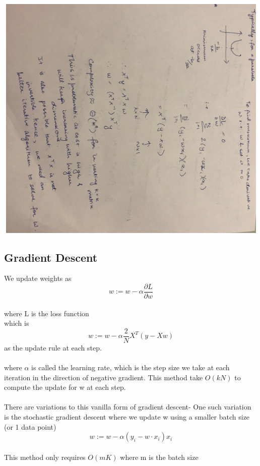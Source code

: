 \includegraphics[width=15cm,height = 12cm, angle = 90, origin=c]{figures/compute_2.JPG}




\subsection{Gradient Descent}
We update weights as $$w := w - \alpha\frac{\partial L}{\partial w}$$
\\
where L is the loss function
\\
which is $$w := w - \alpha\frac{2}{N}X^T(y-Xw)$$ as the update rule at each step.
\\
\\
where $\alpha$ is called the learning rate, which is the step size we take at each iteration in the direction of negative gradient. This method take $O(kN)$ to compute the update for w at each step.
\\
\\
There are variations to this vanilla form of gradient descent-
One such variation is the stochastic gradient descent where we update w using a smaller batch size (or 1 data point)
$$w := w - \alpha(y_i - w \cdot x_i)x_i$$ 
\\
This method only requires $O(mK)$ where m is the batch size
